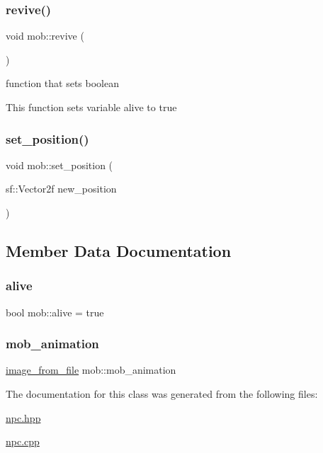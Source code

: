 \mbox{\label{classmob_a3bce6c06653881f8be86fbc60a2b67cb}} 
\subsubsection{\texorpdfstring{revive()}{revive()}}
{\footnotesize\ttfamily void mob\+::revive (\begin{DoxyParamCaption}{ }\end{DoxyParamCaption})}



function that sets boolean 

This function sets variable alive to true \mbox{\label{classmob_a6556e84e416fd496450d18dd1d0eb1f2}} 
\subsubsection{\texorpdfstring{set\+\_\+position()}{set\_position()}}
{\footnotesize\ttfamily void mob\+::set\+\_\+position (\begin{DoxyParamCaption}\item[{sf\+::\+Vector2f}]{new\+\_\+position }\end{DoxyParamCaption})}



\subsection{Member Data Documentation}
\mbox{\label{classmob_aae8e9788785c59d1f4c81c8e0d0e5227}} 
\subsubsection{\texorpdfstring{alive}{alive}}
{\footnotesize\ttfamily bool mob\+::alive = true\hspace{0.3cm}{\ttfamily [private]}}

\mbox{\label{classmob_a28d29e0a52a7094c995df09dcdcf0d3e}} 
\subsubsection{\texorpdfstring{mob\+\_\+animation}{mob\_animation}}
{\footnotesize\ttfamily \hyperlink{classimage__from__file}{image\+\_\+from\+\_\+file} mob\+::mob\+\_\+animation\hspace{0.3cm}{\ttfamily [private]}}



The documentation for this class was generated from the following files\+:\begin{DoxyCompactItemize}
\item 
\hyperlink{npc_8hpp}{npc.\+hpp}\item 
\hyperlink{npc_8cpp}{npc.\+cpp}\end{DoxyCompactItemize}
